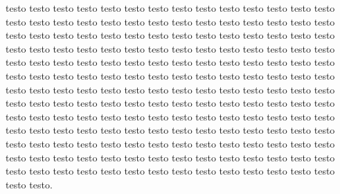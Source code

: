 \documentclass[11pt,a4paper]{book}
\begin{document}
\begin{pages}

\begin{Rightside}
\beginnumbering

    \pstart
      testo testo testo testo testo testo testo testo testo testo testo testo testo testo testo testo testo testo testo testo testo testo testo testo testo testo testo testo testo testo testo testo testo testo testo testo testo testo testo testo testo testo testo testo testo testo testo testo testo testo testo testo testo testo testo testo testo testo testo testo testo testo testo testo testo testo testo testo testo testo testo testo testo testo testo testo testo testo testo testo testo testo testo testo testo testo testo testo testo testo testo testo testo testo testo testo testo testo testo testo testo testo testo testo testo testo testo testo testo testo testo testo testo testo testo testo testo testo testo testo testo testo testo testo testo testo testo testo testo testo testo testo testo testo testo testo testo testo testo testo testo testo testo testo testo testo testo testo testo testo testo testo testo testo testo testo testo testo testo testo testo testo testo testo testo testo testo testo testo testo testo testo testo testo testo testo testo testo testo testo testo testo testo testo.\pend

\endnumbering
\end{Rightside}

\begin{Leftside}
\beginnumbering


\end{Leftside}
\end{pages}
\end{document}
